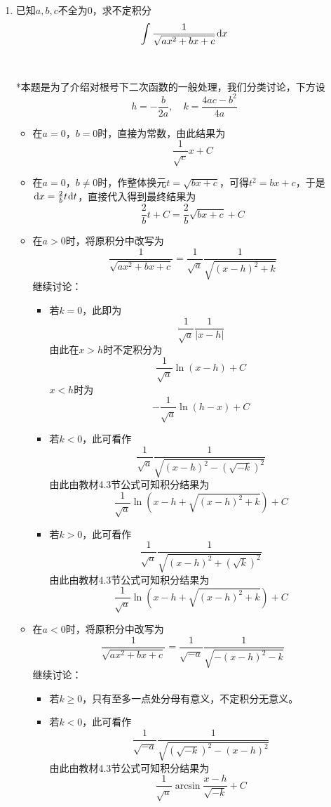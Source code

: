 \documentclass[a4paper,UTF8,fontset=windows]{ctexart}
\newcommand*{\dr}{\hspace{0.07em}\mathrm{d}}
\begin{document}
\begin{enumerate}
    \item 已知$a,b,c$不全为0，求不定积分
    $$\int\frac{1}{\sqrt{ax^2+bx+c}}\dr x$$
    
    \

    *本题是为了介绍对根号下二次函数的一般处理，我们分类讨论，下方设
    $$h=-\frac{b}{2a},\quad k=\frac{4ac-b^2}{4a}$$
    \begin{itemize}
        \item 在$a=0$，$b=0$时，直接为常数，由此结果为
        $$\frac{1}{\sqrt c}x+C$$
        \item 在$a=0$，$b\ne0$时，作整体换元$t=\sqrt{bx+c}$，可得$t^2=bx+c$，于是$\dr x=\frac{2}{b}t\dr t$，直接代入得到最终结果为
        $$\frac{2}{b}t+C=\frac{2}{b}\sqrt{bx+c}+C$$
        \item 在$a>0$时，将原积分中改写为
        $$\frac{1}{\sqrt{ax^2+bx+c}}=\frac{1}{\sqrt a}\frac{1}{\sqrt{(x-h)^2+k}}$$
        继续讨论：
        \begin{itemize}
            \item 若$k=0$，此即为
            $$\frac{1}{\sqrt a}\frac{1}{|x-h|}$$
            由此在$x>h$时不定积分为
            $$\frac{1}{\sqrt a}\ln(x-h)+C$$
            $x<h$时为
            $$-\frac{1}{\sqrt a}\ln(h-x)+C$$
            \item 若$k<0$，此可看作
            $$\frac{1}{\sqrt a}\frac{1}{\sqrt{(x-h)^2-(\sqrt{-k})^2}}$$
            由此由教材4.3节公式可知积分结果为
            $$\frac{1}{\sqrt a}\ln(x-h+\sqrt{(x-h)^2+k})+C$$
            \item 若$k>0$，此可看作
            $$\frac{1}{\sqrt a}\frac{1}{\sqrt{(x-h)^2+(\sqrt{k})^2}}$$
            由此由教材4.3节公式可知积分结果为
            $$\frac{1}{\sqrt a}\ln(x-h+\sqrt{(x-h)^2+k})+C$$
        \end{itemize}
        \item 在$a<0$时，将原积分中改写为
        $$\frac{1}{\sqrt{ax^2+bx+c}}=\frac{1}{\sqrt{-a}}\frac{1}{\sqrt{-(x-h)^2-k}}$$
        继续讨论：
        \begin{itemize}
            \item 若$k\ge0$，只有至多一点处分母有意义，不定积分无意义。
            \item 若$k<0$，此可看作
            $$\frac{1}{\sqrt{-a}}\frac{1}{\sqrt{(\sqrt{-k})^2-(x-h)^2}}$$
            由此由教材4.3节公式可知积分结果为
            $$\frac{1}{\sqrt a}\arcsin\frac{x-h}{\sqrt{-k}}+C$$
        \end{itemize}
    \end{itemize}


\end{enumerate}
\end{document}
